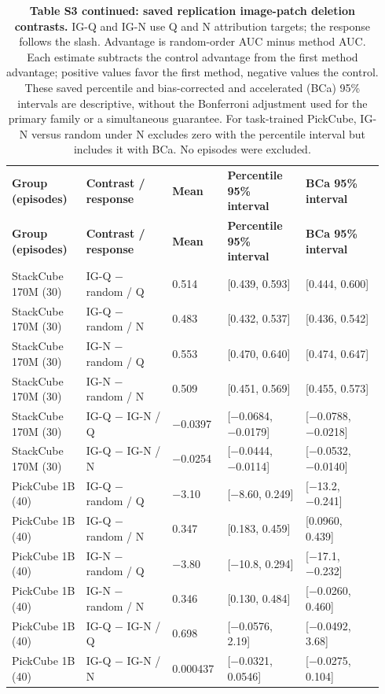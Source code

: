 \setlength{\tabcolsep}{2pt}
\begin{longtable}{p{0.190\linewidth} p{0.220\linewidth} p{0.130\linewidth} p{0.200\linewidth} p{0.200\linewidth}}
\noalign{\addtocounter{table}{-1}}
\caption*{\textbf{Table S3 continued: saved replication image-patch deletion contrasts.} IG-Q and IG-N use Q and N attribution targets; the response follows the slash. Advantage is random-order AUC minus method AUC. Each estimate subtracts the control advantage from the first method advantage; positive values favor the first method, negative values the control. These saved percentile and bias-corrected and accelerated (BCa) 95\% intervals are descriptive, without the Bonferroni adjustment used for the primary family or a simultaneous guarantee. For task-trained PickCube, IG-N versus random under N excludes zero with the percentile interval but includes it with BCa. No episodes were excluded.}\\
\toprule
\textbf{Group (episodes)} & \textbf{Contrast / response} & \textbf{Mean} & \textbf{Percentile 95\% interval} & \textbf{BCa 95\% interval} \\
\midrule\endfirsthead
\toprule
\textbf{Group (episodes)} & \textbf{Contrast / response} & \textbf{Mean} & \textbf{Percentile 95\% interval} & \textbf{BCa 95\% interval} \\
\midrule\endhead
\bottomrule\endfoot
StackCube 170M (30) & IG-Q − random / Q & 0.514 & [0.439, 0.593] & [0.444, 0.600] \\
StackCube 170M (30) & IG-Q − random / N & 0.483 & [0.432, 0.537] & [0.436, 0.542] \\
StackCube 170M (30) & IG-N − random / Q & 0.553 & [0.470, 0.640] & [0.474, 0.647] \\
StackCube 170M (30) & IG-N − random / N & 0.509 & [0.451, 0.569] & [0.455, 0.573] \\
StackCube 170M (30) & IG-Q − IG-N / Q & −0.0397 & [−0.0684, −0.0179] & [−0.0788, −0.0218] \\
StackCube 170M (30) & IG-Q − IG-N / N & −0.0254 & [−0.0444, −0.0114] & [−0.0532, −0.0140] \\
PickCube 1B (40) & IG-Q − random / Q & −3.10 & [−8.60, 0.249] & [−13.2, −0.241] \\
PickCube 1B (40) & IG-Q − random / N & 0.347 & [0.183, 0.459] & [0.0960, 0.439] \\
PickCube 1B (40) & IG-N − random / Q & −3.80 & [−10.8, 0.294] & [−17.1, −0.232] \\
PickCube 1B (40) & IG-N − random / N & 0.346 & [0.130, 0.484] & [−0.0260, 0.460] \\
PickCube 1B (40) & IG-Q − IG-N / Q & 0.698 & [−0.0576, 2.19] & [−0.0492, 3.68] \\
PickCube 1B (40) & IG-Q − IG-N / N & 0.000437 & [−0.0321, 0.0546] & [−0.0275, 0.104] \\
\end{longtable}
